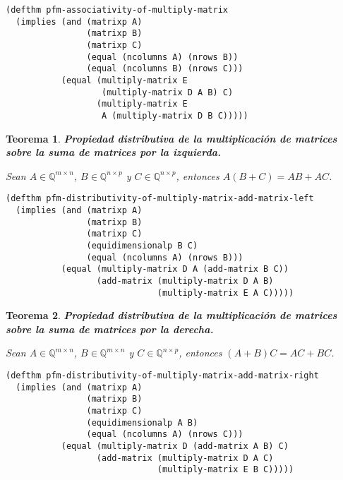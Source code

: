 \documentclass[a4paper,10pt]{article}
\newcommand{\M}[3]{#1 \in \mathbb{Q}^{#2 \times #3}}
\newtheorem{teor}{{Teorema}}
\begin{document}
\begin{lstlisting}[language=clips]
(defthm pfm-associativity-of-multiply-matrix
  (implies (and (matrixp A)
                (matrixp B)
                (matrixp C)
                (equal (ncolumns A) (nrows B))
                (equal (ncolumns B) (nrows C)))
           (equal (multiply-matrix E 
                   (multiply-matrix D A B) C)
                  (multiply-matrix E 
                   A (multiply-matrix D B C)))))
\end{lstlisting}	

\par \vspace{16pt}

\begin{teor} \textbf{Propiedad distributiva de la multiplicación de matrices sobre la suma de matrices por la izquierda.}\vspace{8pt}\par
Sean $\M{A}{m}{n}$, $\M{B}{n}{p}$ y $\M{C}{n}{p}$, entonces $A(B+C) = AB + AC$.
\end{teor}

\begin{lstlisting}[language=clips]
(defthm pfm-distributivity-of-multiply-matrix-add-matrix-left
  (implies (and (matrixp A)
                (matrixp B)
                (matrixp C)
                (equidimensionalp B C)
                (equal (ncolumns A) (nrows B)))
           (equal (multiply-matrix D A (add-matrix B C))
                  (add-matrix (multiply-matrix D A B) 
                              (multiply-matrix E A C)))))
\end{lstlisting}	

\par \vspace{16pt}

\begin{teor} \textbf{Propiedad distributiva de la multiplicación de matrices sobre la suma de matrices por la derecha.}\vspace{8pt}\par
Sean $\M{A}{m}{n}$, $\M{B}{m}{n}$ y $\M{C}{n}{p}$, entonces $(A+B)C = AC + BC$.
\end{teor}

\begin{lstlisting}[language=clips]
(defthm pfm-distributivity-of-multiply-matrix-add-matrix-right
  (implies (and (matrixp A)
                (matrixp B)
                (matrixp C)
                (equidimensionalp A B)
                (equal (ncolumns A) (nrows C)))
           (equal (multiply-matrix D (add-matrix A B) C)
                  (add-matrix (multiply-matrix D A C) 
                              (multiply-matrix E B C)))))
\end{lstlisting}
\end{document}
